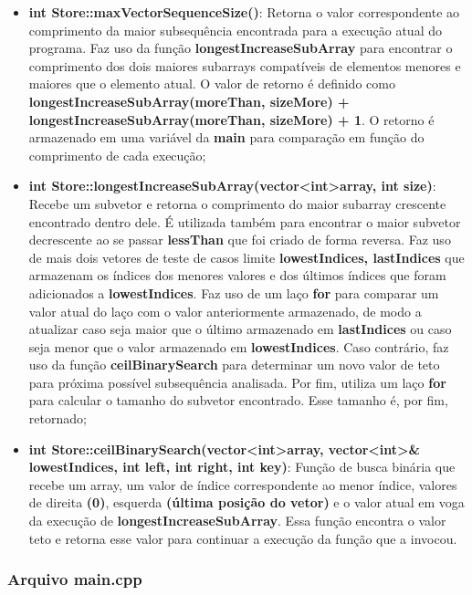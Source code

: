 \documentclass[12pt]{article}
\begin{document}
\begin{itemize}
    \item \textbf{int Store::maxVectorSequenceSize()}: Retorna o valor correspondente ao comprimento da maior subsequência encontrada para a execução atual do programa. Faz uso da função \textbf{longestIncreaseSubArray} para encontrar o comprimento dos dois maiores subarrays compatíveis de elementos menores e maiores que o elemento atual. O valor de retorno é definido como \textbf{longestIncreaseSubArray(moreThan, sizeMore) + longestIncreaseSubArray(moreThan, sizeMore) + 1}. O retorno é armazenado em uma variável da \textbf{main} para comparação em função do comprimento de cada execução;
    \item \textbf{int Store::longestIncreaseSubArray(vector\textless int\textgreater array, int size)}: Recebe um subvetor e retorna o comprimento do maior subarray crescente encontrado dentro dele. É utilizada também para encontrar o maior subvetor decrescente ao se passar \textbf{lessThan} que foi criado de forma reversa. Faz uso de mais dois vetores de teste de casos limite \textbf{lowestIndices, lastIndices} que armazenam os índices dos menores valores e dos últimos índices que foram adicionados a \textbf{lowestIndices}. Faz uso de um laço \textbf{for} para comparar um valor atual do laço com o valor anteriormente armazenado, de modo a atualizar caso seja maior que o último armazenado em \textbf{lastIndices} ou caso seja menor que o valor armazenado em \textbf{lowestIndices}. Caso contrário, faz uso da função \textbf{ceilBinarySearch} para determinar um novo valor de teto para próxima possível subsequência analisada. Por fim, utiliza um laço \textbf{for} para calcular o tamanho do subvetor encontrado. Esse tamanho é, por fim, retornado;
    \item \textbf{int Store::ceilBinarySearch(vector\textless int\textgreater array, vector\textless int\textgreater\& lowestIndices, int left, int right, int key)}: Função de busca binária que recebe um array, um valor de índice correspondente ao menor índice, valores de direita \textbf{(0)}, esquerda \textbf{(última posição do vetor)} e o valor atual em voga da execução de \textbf{longestIncreaseSubArray}. Essa função encontra o valor teto e retorna esse valor para continuar a execução da função que a invocou.
    \end{itemize}
    
    \subsubsection{Arquivo main.cpp}
    
\end{document}
